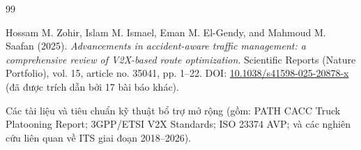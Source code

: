 \documentclass[a4paper]{article}
\begin{document}
\clearpage

\begin{thebibliography}{99}

Hossam M. Zohir, Islam M. Ismael, Eman M. El-Gendy, and Mahmoud M. Saafan (2025). \textit{Advancements in accident-aware traffic management: a comprehensive review of V2X-based route optimization}. Scientific Reports (Nature Portfolio), vol. 15, article no. 35041, pp. 1--22. DOI: \href{https://doi.org/10.1038/s41598-025-20878-x}{10.1038/s41598-025-20878-x} (đã được trích dẫn bởi 17 bài báo khác).

Các tài liệu và tiêu chuẩn kỹ thuật bổ trợ mở rộng (gồm: PATH CACC Truck Platooning Report; 3GPP/ETSI V2X Standards; ISO 23374 AVP; và các nghiên cứu liên quan về ITS giai đoạn 2018--2026).

\end{thebibliography}
\end{document}

